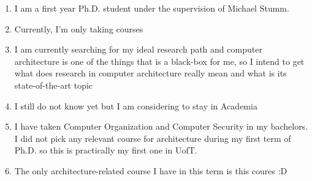 
\begin{enumerate}
  \item I am a first year Ph.D. student under the supervision of Michael Stumm.
  \item Currently, I'm only taking courses
  \item I am currently searching for my ideal research path 
        and computer architecture is one of the things that is a black-box
        for me, so I intend to get what does research in computer architecture really mean and 
        what is its state-of-the-art topic
  \item I still do not know yet but I am considering to stay in Academia
  \item I have taken Computer Organization and Computer Security in my bachelors. I did not pick any relevant course for architecture
        during my first term of Ph.D. so this is practically my first one in UofT.
  \item The only architecture-related course I have in this term is this coures :D
\end{enumerate}